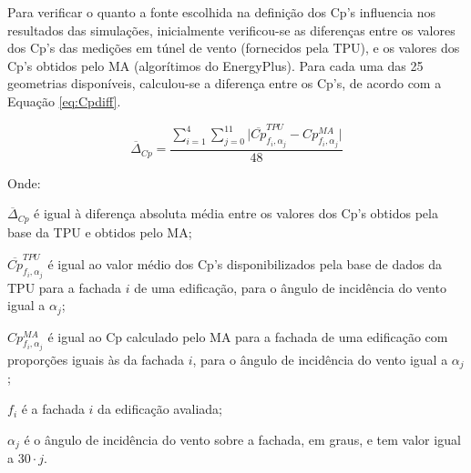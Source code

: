 \documentclass[brazil,hardcopy,openany,a5paper]{ufscthesis}
\begin{document}
		Para verificar o quanto a fonte escolhida na definição dos Cp's influencia nos resultados das simulações, inicialmente verificou-se as diferenças entre os valores dos Cp's das medições em túnel de vento (fornecidos pela TPU), e os valores dos Cp's obtidos pelo MA (algorítimos do EnergyPlus). Para cada uma das 25 geometrias disponíveis, calculou-se a diferença entre os Cp's, de acordo com a Equação \ref{eq:Cpdiff}.
		
		\begin{equation}
		\label{eq:Cpdiff}
		\overline{\Delta}_{Cp} = \frac{\sum_{i=1}^{4}{\sum_{j=0}^{11}{|\overline{Cp}^{TPU}_{f_i,\alpha_j} - Cp^{MA}_{f_i,\alpha_j}}|}}{48}
		\end{equation}
		
		Onde:
		
		$\overline{\Delta}_{Cp}$ é igual à diferença absoluta média entre os valores dos Cp's obtidos pela base da TPU e obtidos pelo MA;
		
		$\overline{Cp}^{TPU}_{f_i,\alpha_j}$ é igual ao valor médio dos Cp's disponibilizados pela base de dados da TPU para a fachada $i$ de uma edificação, para o ângulo de incidência do vento igual a $\alpha_j$;
		
		$Cp^{MA}_{f_i,\alpha_j}$ é igual ao Cp calculado pelo MA para a fachada de uma edificação com proporções iguais às da fachada $i$, para o ângulo de incidência do vento igual a $\alpha_j$;
		
		$f_i$ é a fachada $i$ da edificação avaliada;
		
		$\alpha_j$ é o ângulo de incidência do vento  sobre a fachada, em graus, e tem valor igual a $30 \cdot j$.		
		\\
		
\end{document}
